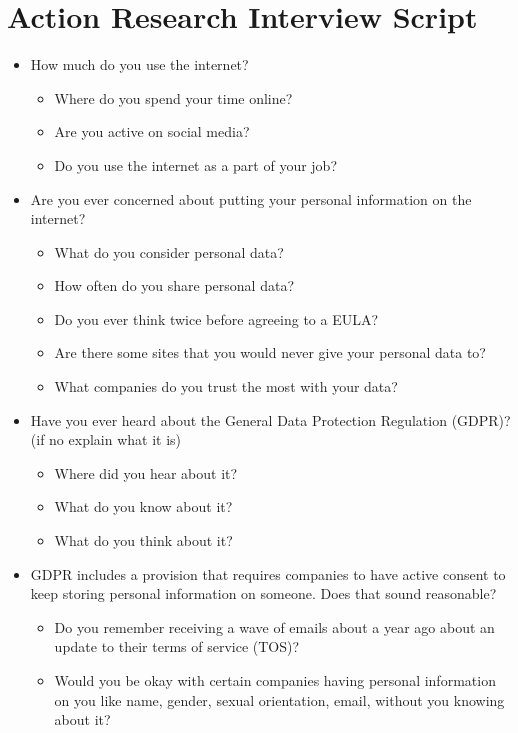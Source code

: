 \documentclass[12pt,
 reprint,
nofootinbib,
 amsmath,amssymb,
 aps,
]{revtex4-2}
\begin{document}
\section{Action Research Interview Script}
\label{appendix:a}
\begin{itemize}
    \item How much do you use the internet?
    \begin{itemize}
        \item Where do you spend your time online?
        \item Are you active on social media?
        \item Do you use the internet as a part of your job?
    \end{itemize} 
    \item Are you ever concerned about putting your personal information on the internet?
    \begin{itemize}
        \item What do you consider personal data?
        \item How often do you share personal data?
        \item Do you ever think twice before agreeing to a EULA?
        \item Are there some sites that you would never give your personal data to?
        \item What companies do you trust the most with your data?
    \end{itemize}
    \item Have you ever heard about the General Data Protection Regulation (GDPR)? (if no explain what it is)
    \begin{itemize}
        \item Where did you hear about it?
        \item What do you know about it?
        \item What do you think about it?
    \end{itemize}
    \item GDPR includes a provision that requires companies to have active consent to keep storing personal information on someone. Does that sound reasonable?
    \begin{itemize}
        \item Do you remember receiving a wave of emails about a year ago about an update to their terms of service (TOS)?
        \item Would you be okay with certain companies having personal information on you like name, gender, sexual orientation, email, without you knowing about it?

\end{itemize}
\end{itemize}
\end{document}
